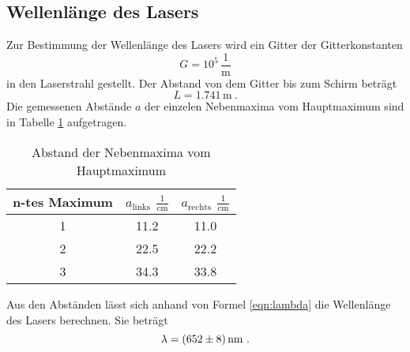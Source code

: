 \subsection{Wellenlänge des Lasers}
Zur Bestimmung der Wellenlänge des Lasers wird ein Gitter der Gitterkonstanten
\begin{equation}
  G = 10^5 \, \frac{1}{\text{m}}
  \label{eqn:constg}
\end{equation}
in den Laserstrahl gestellt. Der Abstand von dem Gitter bis zum Schirm beträgt
\begin{equation}
  L = 1.741 \, \text{m} \ .
  \label{eqn:K}
\end{equation}
Die gemessenen Abstände $a$ der einzelen Nebenmaxima vom Hauptmaximum sind in Tabelle \ref{tab:max} aufgetragen.
\begin{table}
  \centering
  \begin{tabular}{c c c}
    \toprule
    n-tes Maximum & $a_\text{links}$ $\frac{1}{\text{cm}}$ & $a_\text{rechts}$ $\frac{1}{\text{cm}}$ \\
    \midrule
	1 & 11.2 & 11.0 \\
	2 & 22.5 & 22.2 \\
	3 & 34.3 & 33.8 \\
    \bottomrule
  \end{tabular}
  \caption{Abstand der Nebenmaxima vom Hauptmaximum}
  \label{tab:max}
\end{table}
Aus den Abständen lässt sich anhand von Formel \ref{eqn:lambda} die Wellenlänge des Lasers berechnen. Sie beträgt
\begin{equation}
  \lambda = (\num{652 +- 8}) \, \text{nm} \ .
\end{equation}
